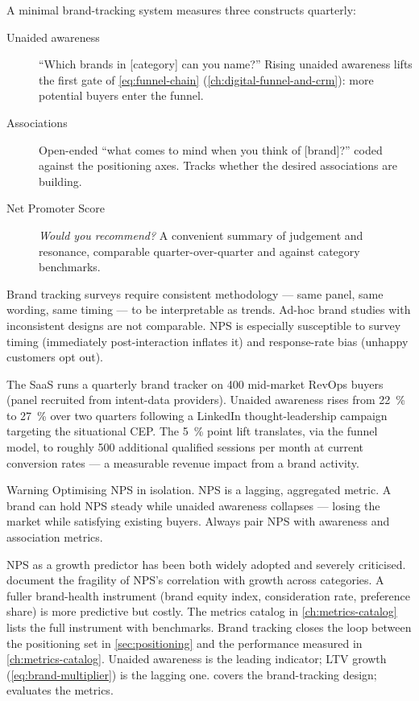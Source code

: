 A minimal brand-tracking system measures three constructs quarterly:

\begin{description}
  \item[Unaided awareness] ``Which brands in [category] can you name?'' Rising unaided awareness lifts the first gate of \cref{eq:funnel-chain} (\cref{ch:digital-funnel-and-crm}): more potential buyers enter the funnel.
  \item[Associations] Open-ended ``what comes to mind when you think of [brand]?'' coded against the positioning axes. Tracks whether the desired associations are building.
  \item[Net Promoter Score] \emph{Would you recommend?} A convenient summary of judgement and resonance, comparable quarter-over-quarter and against category benchmarks.
\end{description}

Brand tracking surveys require consistent methodology --- same panel, same wording, same timing --- to be interpretable as trends. Ad-hoc brand studies with inconsistent designs are not comparable. NPS is especially susceptible to survey timing (immediately post-interaction inflates it) and response-rate bias (unhappy customers opt out).

\begin{example}
The SaaS runs a quarterly brand tracker on 400 mid-market RevOps buyers (panel recruited from intent-data providers). Unaided awareness rises from \qty{22}{\percent} to \qty{27}{\percent} over two quarters following a LinkedIn thought-leadership campaign targeting the situational CEP. The \qty{5}{\percent} point lift translates, via the funnel model, to roughly 500 additional qualified sessions per month at current conversion rates --- a measurable revenue impact from a brand activity.
\end{example}

\begin{admonition}{Warning}
Optimising NPS in isolation. NPS is a lagging, aggregated metric. A brand can hold NPS steady while unaided awareness collapses --- losing the market while satisfying existing buyers. Always pair NPS with awareness and association metrics.
\end{admonition}

NPS as a growth predictor has been both widely adopted and severely criticised. \textcite{bendle2020marketing} document the fragility of NPS's correlation with growth across categories. A fuller brand-health instrument (brand equity index, consideration rate, preference share) is more predictive but costly. The metrics catalog in \cref{ch:metrics-catalog} lists the full instrument with benchmarks. Brand tracking closes the loop between the positioning set in \cref{sec:positioning} and the performance measured in \cref{ch:metrics-catalog}. Unaided awareness is the leading indicator; LTV growth (\cref{eq:brand-multiplier}) is the lagging one. \textcite{kotler2021} covers the brand-tracking design; \textcite{bendle2020marketing} evaluates the metrics.
